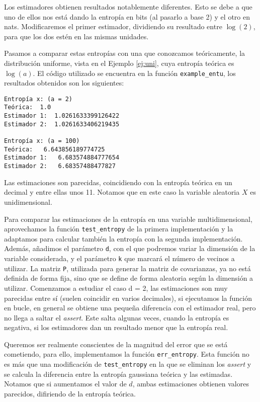 \documentclass[10pt,a4paper]{article} %
\theoremstyle{definition}
\begin{document}
Los estimadores obtienen resultados notablemente diferentes. Esto se debe a que uno de ellos nos está dando la entropía en bits (al pasarlo a base 2) y el otro en nats. Modificaremos el primer estimador, dividiendo su resultado entre $\log(2)$, para que los dos estén en las mismas unidades.

Pasamos a comparar estas entropías con una que conozcamos teóricamente, la distribución uniforme, vista en el Ejemplo \ref{ej:uni}, cuya entropía teórica es $\log(a)$. El código utilizado se encuentra en la función \texttt{example\_entu}, los resultados obtenidos son los siguientes:

\begin{lstlisting}
Entropía x: (a = 2)
Teórica:  1.0
Estimador 1:  1.0261633399126422
Estimador 2:  1.0261633406219435

Entropía x: (a = 100)
Teórica:   6.643856189774725
Estimador 1:   6.683574884777654
Estimador 2:   6.68357488477827
\end{lstlisting}

Las estimaciones son parecidas, coincidiendo con la entropía teórica en un decimal y entre ellas unos 11. Notamos que en este caso la variable aleatoria $X$ es unidimensional.

Para comparar las estimaciones de la entropía en una variable multidimensional, aprovechamos la función \texttt{test\_entropy} de la primera implementación y la adaptamos para calcular también la entropía con la segunda implementación. Además, añadimos el parámetro \texttt{d}, con el que podremos variar la dimensión de la variable considerada, y el parámetro \texttt{k} que marcará el número de vecinos a utilizar. La matriz \texttt{P}, utilizada para generar la matriz de covarianzas, ya no está definida de forma fija, sino que se define de forma aleatoria según la dimensión a utilizar. Comenzamos a estudiar el caso d = 2, las estimaciones son muy parecidas entre sí (suelen coincidir en varios decimales), si ejecutamos la función en bucle, en general se obtiene una pequeña diferencia con el estimador real, pero no llega a saltar el \textit{assert}. Este salta algunas veces, cuando la entropía es negativa, si los estimadores dan un resultado menor que la entropía real.

Queremos ser realmente conscientes de la magnitud del error que se está cometiendo, para ello, implementamos la función \texttt{err\_entropy}. Esta función no es más que una modificación de \texttt{test\_entropy} en la que se eliminan los \textit{assert} y se calcula la diferencia entre la entropía gaussiana teórica y las estimadas. Notamos que si aumentamos el valor de $d$, ambas estimaciones obtienen valores parecidos, difiriendo de la entropía teórica.
\end{document}
